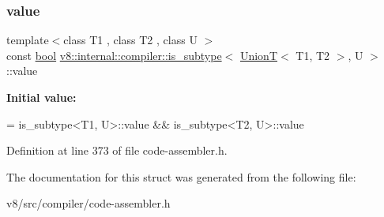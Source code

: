 \subsubsection{\texorpdfstring{value}{value}}
{\footnotesize\ttfamily template$<$class T1 , class T2 , class U $>$ \\
const \mbox{\hyperlink{classbool}{bool}} \mbox{\hyperlink{structv8_1_1internal_1_1compiler_1_1is__subtype}{v8\+::internal\+::compiler\+::is\+\_\+subtype}}$<$ \mbox{\hyperlink{structv8_1_1internal_1_1UnionT}{UnionT}}$<$ T1, T2 $>$, U $>$\+::value\hspace{0.3cm}{\ttfamily [static]}}

{\bfseries Initial value\+:}
\begin{DoxyCode}
=
      is\_subtype<T1, U>::value && is\_subtype<T2, U>::value
\end{DoxyCode}


Definition at line 373 of file code-\/assembler.\+h.



The documentation for this struct was generated from the following file\+:\begin{DoxyCompactItemize}
\item 
v8/src/compiler/code-\/assembler.\+h\end{DoxyCompactItemize}
